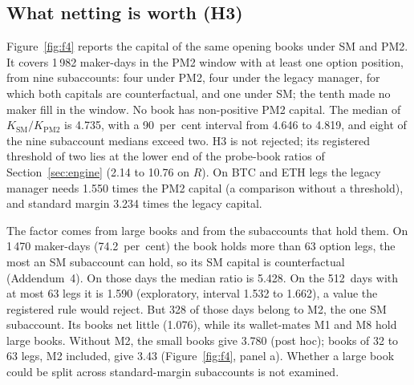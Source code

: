 \documentclass[a4paper,fleqn]{cas-dc}
\begin{document}
\subsection{What netting is worth (H3)}
Figure~\ref{fig:f4} reports the capital of the same opening books under SM and PM2. It covers 1\,982
maker-days in the PM2 window with at least one option position, from nine subaccounts: four under PM2, four
under the legacy manager, for which both capitals are counterfactual, and one under SM; the tenth made no
maker fill in the window. No book has non-positive PM2 capital. The median of
$K_{\mathrm{SM}}/K_{\mathrm{PM2}}$ is 4.735, with a 90~per~cent interval from 4.646 to 4.819, and eight of the
nine subaccount medians exceed two. H3 is not rejected; its registered threshold of two lies at the lower end of
the probe-book ratios of Section~\ref{sec:engine} (2.14 to 10.76 on $R$). On BTC and ETH legs the legacy
manager needs 1.550 times the PM2 capital (a comparison without a threshold), and standard margin 3.234 times
the legacy capital.

The factor comes from large books and from the subaccounts that hold them. On 1\,470 maker-days (74.2~per~cent) the
book holds more than 63 option legs, the most an SM subaccount can hold, so its SM capital is counterfactual
(Addendum~4). On those days the median ratio is 5.428. On the 512~days with at most 63 legs it is 1.590 (exploratory,
interval 1.532 to 1.662), a value the registered rule would reject. But 328 of those days belong to M2, the one SM
subaccount. Its books net little (1.076), while its wallet-mates M1 and M8 hold large books.
Without M2, the small books give 3.780 (post hoc); books of 32 to 63 legs, M2 included, give 3.43
(Figure~\ref{fig:f4}, panel a). Whether a large book could be split across standard-margin subaccounts is not examined.
\end{document}
